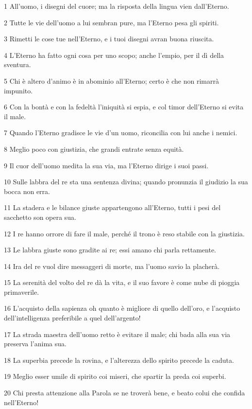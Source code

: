 \par 1 All'uomo, i disegni del cuore; ma la risposta della lingua vien dall'Eterno.
\par 2 Tutte le vie dell'uomo a lui sembran pure, ma l'Eterno pesa gli spiriti.
\par 3 Rimetti le cose tue nell'Eterno, e i tuoi disegni avran buona riuscita.
\par 4 L'Eterno ha fatto ogni cosa per uno scopo; anche l'empio, per il dì della sventura.
\par 5 Chi è altero d'animo è in abominio all'Eterno; certo è che non rimarrà impunito.
\par 6 Con la bontà e con la fedeltà l'iniquità si espia, e col timor dell'Eterno si evita il male.
\par 7 Quando l'Eterno gradisce le vie d'un uomo, riconcilia con lui anche i nemici.
\par 8 Meglio poco con giustizia, che grandi entrate senza equità.
\par 9 Il cuor dell'uomo medita la sua via, ma l'Eterno dirige i suoi passi.
\par 10 Sulle labbra del re sta una sentenza divina; quando pronunzia il giudizio la sua bocca non erra.
\par 11 La stadera e le bilance giuste appartengono all'Eterno, tutti i pesi del sacchetto son opera sua.
\par 12 I re hanno orrore di fare il male, perché il trono è reso stabile con la giustizia.
\par 13 Le labbra giuste sono gradite ai re; essi amano chi parla rettamente.
\par 14 Ira del re vuol dire messaggeri di morte, ma l'uomo savio la placherà.
\par 15 La serenità del volto del re dà la vita, e il suo favore è come nube di pioggia primaverile.
\par 16 L'acquisto della sapienza oh quanto è migliore di quello dell'oro, e l'acquisto dell'intelligenza preferibile a quel dell'argento!
\par 17 La strada maestra dell'uomo retto è evitare il male; chi bada alla sua via preserva l'anima sua.
\par 18 La superbia precede la rovina, e l'alterezza dello spirito precede la caduta.
\par 19 Meglio esser umile di spirito coi miseri, che spartir la preda coi superbi.
\par 20 Chi presta attenzione alla Parola se ne troverà bene, e beato colui che confida nell'Eterno!

